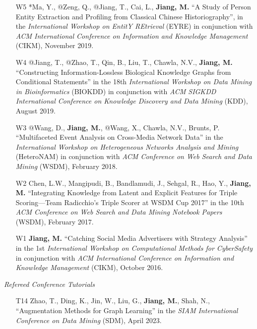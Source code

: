 \documentclass[10pt]{article}
\newenvironment{myindentpar}[1]%
{\begin{list}{}%
         {\setlength{\leftmargin}{#1}}%
         \item[]%
}
{\end{list}}
\newcounter{list}
\begin{document}
\begin{myindentpar}{0.00cm}
\begin{enumerate}[leftmargin=.5cm]
\item[W5] *Ma, Y., @Zeng, Q., @Jiang, T., Cai, L., \textbf{Jiang, M.} ``A Study of Person Entity Extraction and Profiling from Classical Chinese Historiography'', in the \textit{International Workshop on EntitY REtrieval} (EYRE) in conjunction with \textit{ACM International Conference on Information and Knowledge Management} (CIKM), November 2019.

\item[W4] @Jiang, T., @Zhao, T., Qin, B., Liu, T., Chawla, N.V., \textbf{Jiang, M.} ``Constructing Information-Lossless Biological Knowledge Graphs from Conditional Statements'' in the 18th \textit{International Workshop on Data Mining in Bioinformatics} (BIOKDD) in conjunction with \textit{ACM SIGKDD International Conference on Knowledge Discovery and Data Mining} (KDD), August 2019.

\item[W3] @Wang, D., \textbf{Jiang, M.}, @Wang, X., Chawla, N.V., Brunts, P. ``Multifaceted Event Analysis on Cross-Media Network Data'' in the \textit{International Workshop on Heterogeneous Networks Analysis and Mining} (HeteroNAM) in conjunction with \textit{ACM Conference on Web Search and Data Mining} (WSDM), February 2018.

\item[W2] Chen, L.W., Mangipudi, B., Bandlamudi, J., Sehgal, R., Hao, Y., \textbf{Jiang, M.} ``Integrating Knowledge from Latent and Explicit Features for Triple Scoring—Team Radicchio's Triple Scorer at WSDM Cup 2017'' in the 10th \textit{ACM Conference on Web Search and Data Mining Notebook Papers} (WSDM), February 2017.

\item[W1] \textbf{Jiang, M.} ``Catching Social Media Advertisers with Strategy Analysis'' in the 1st \textit{International Workshop on Computational Methods for CyberSafety} in conjunction with \textit{ACM International Conference on Information and Knowledge Management} (CIKM), October 2016.

\end{enumerate}

\hspace{-0.25cm}\textit{Refereed Conference Tutorials}

\begin{enumerate}[leftmargin=.5cm]

\item[T14] Zhao, T., Ding, K., Jin, W., Liu, G., \textbf{Jiang, M.}, Shah, N., ``Augmentation Methods for Graph Learning'' in the \textit{SIAM International Conference on Data Mining} (SDM), April 2023.
		

\end{enumerate}
\end{myindentpar}
\end{document}
